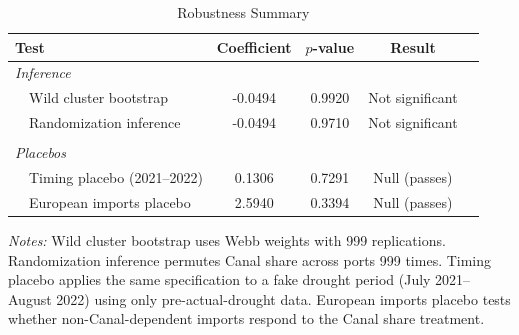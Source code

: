 \begin{table}[H]
\centering
\caption{Robustness Summary}
\label{tab:robust_summary}
\begin{threeparttable}
\begin{tabular}{lcccc}
\toprule
Test & Coefficient & $p$-value & Result \\
\midrule
\textit{Inference} & & & \\
~~Wild cluster bootstrap & -0.0494 & 0.9920 & Not significant \\
~~Randomization inference & -0.0494 & 0.9710 & Not significant \\
\\
\textit{Placebos} & & & \\
~~Timing placebo (2021--2022) & 0.1306 & 0.7291 & Null (passes) \\
~~European imports placebo & 2.5940 & 0.3394 & Null (passes) \\
\bottomrule
\end{tabular}
\begin{tablenotes}[flushleft]
\small
\item \textit{Notes:} Wild cluster bootstrap uses Webb weights with 999 replications. Randomization inference permutes Canal share across ports 999 times. Timing placebo applies the same specification to a fake drought period (July 2021--August 2022) using only pre-actual-drought data. European imports placebo tests whether non-Canal-dependent imports respond to the Canal share treatment.
\end{tablenotes}
\end{threeparttable}
\end{table}
